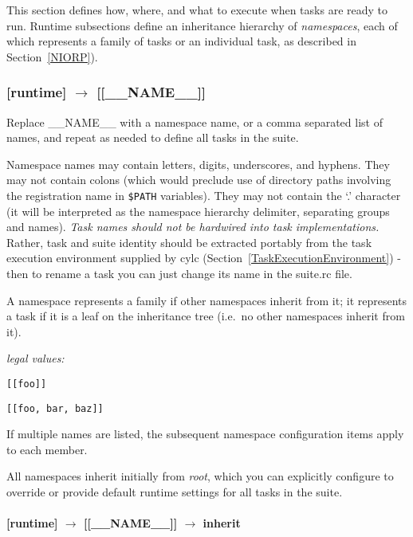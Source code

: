 This section defines how, where, and what to execute when tasks are
ready to run. Runtime subsections define an inheritance hierarchy of 
{\em namespaces}, each of which represents a family of tasks or an
individual task, as described in Section~\ref{NIORP}).

\subsubsection[{[[}\_\_NAME\_\_{]]}]{[runtime] $\rightarrow$ [[\_\_NAME\_\_]]}

Replace \_\_NAME\_\_ with a namespace name, or a comma separated list of
names, and repeat as needed to define all tasks in the suite.

Namespace names may contain letters, digits, underscores, and hyphens.
They may not contain colons (which would preclude use of directory paths
involving the registration name in \lstinline=$PATH= variables). They 
may not contain the `.' character (it will be interpreted 
as the namespace hierarchy delimiter, separating groups and names). 
{\em Task names should not be hardwired into task implementations.}
Rather, task and suite identity should be extracted portably from the
task execution environment supplied by cylc 
(Section~\ref{TaskExecutionEnvironment}) - then to rename a task you
can just change its name in the suite.rc file.

A namespace represents a family if other namespaces inherit from it; it
represents a task if it is a leaf on the inheritance tree (i.e.\ no
other namespaces inherit from it).

\begin{myitemize}
\item {\em legal values:} 
    \begin{myitemize}
        \item \lstinline=[[foo]]=
        \item \lstinline=[[foo, bar, baz]]=
    \end{myitemize}
\end{myitemize}

If multiple names are listed, the subsequent namespace configuration
items apply to each member. 

All namespaces inherit initially from {\em root}, which you can
explicitly configure to override or provide default runtime settings for
all tasks in the suite.

\paragraph[inherit]{[runtime] $\rightarrow$ [[\_\_NAME\_\_]] $\rightarrow$ inherit}

